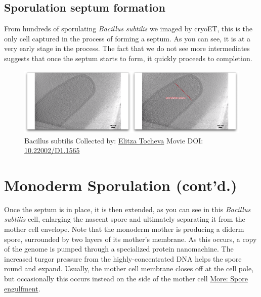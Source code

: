 \documentclass[]{tufte-book}
\begin{document}
\hypertarget{Sporulation_septum_formation}{\subsection{Sporulation
septum formation}\label{Sporulation_septum_formation}}

From hundreds of sporulating \emph{Bacillus subtilis} we imaged by
cryoET, this is the only cell captured in the process of forming a
septum. As you can see, it is at a very early stage in the process. The
fact that we do not see more intermediates suggests that once the septum
starts to form, it quickly proceeds to completion.





\begin{figure}
\includegraphics{movie_stills/8_5a} \caption[Bacillus subtilis Collected by:
\protect\hyperlink{elitza_tocheva}{Elitza Tocheva} Movie DOI:
\href{https://doi.org/10.22002/D1.1565}{10.22002/D1.1565}]{Bacillus subtilis Collected by:
\protect\hyperlink{elitza_tocheva}{Elitza Tocheva} Movie DOI:
\href{https://doi.org/10.22002/D1.1565}{10.22002/D1.1565}}\label{fig:8-5a}
\end{figure}

\section{Monoderm Sporulation
(cont'd.)}\label{monoderm-sporulation-contd.}

Once the septum is in place, it is then extended, as you can see in this
\emph{Bacillus subtilis} cell, enlarging the nascent spore and
ultimately separating it from the mother cell envelope. Note that the
monoderm mother is producing a diderm spore, surrounded by two layers of
its mother's membrane. As this occurs, a copy of the genome is pumped
through a specialized protein nanomachine. The increased turgor pressure
from the highly-concentrated DNA helps the spore round and expand.
Usually, the mother cell membrane closes off at the cell pole, but
occasionally this occurs instead on the side of the mother cell
\protect\hyperlink{Spore_engulfment}{More: Spore engulfment}.
\end{document}
